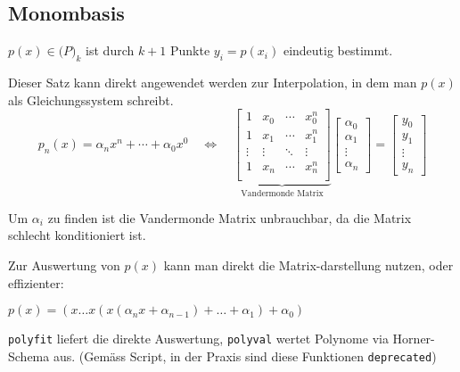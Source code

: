 \subsection{Monombasis}

 $p(x) \in \mathcal(P)_k$ ist durch $k+1$ Punkte $y_i = p(x_i)$ eindeutig bestimmt.

Dieser Satz kann direkt angewendet werden zur Interpolation, in dem man $p(x)$ als Gleichungssystem schreibt.
$$
	p_n(x) = \alpha_n x^n + \cdots + \alpha_0 x^0 \quad \iff \quad
	\underbrace{
		\begin{bmatrix}
			1      & x_0    & \cdots & x_0^n  \\
			1      & x_1    & \cdots & x_1^n  \\
			\vdots & \vdots & \ddots & \vdots \\
			1      & x_n    & \cdots & x_n^n  \\
		\end{bmatrix}
	}_\text{Vandermonde Matrix}
	\begin{bmatrix}
		\alpha_0 \\
		\alpha_1 \\
		\vdots   \\
		\alpha_n
	\end{bmatrix}
	=
	\begin{bmatrix}
		y_0    \\
		y_1    \\
		\vdots \\
		y_n
	\end{bmatrix}
$$

Um $\alpha_i$ zu finden ist die Vandermonde Matrix unbrauchbar, da die Matrix schlecht konditioniert ist.

Zur Auswertung von $p(x)$ kann man direkt die Matrix-darstellung nutzen, oder effizienter:

 $p(x) = (x \ldots x ( x (\alpha_n x + \alpha_{n-1}) + \ldots + \alpha_1) + \alpha_0)$

 \verb|polyfit| liefert die direkte Auswertung, \verb|polyval| wertet Polynome via Horner-Schema aus. (Gemäss Script, in der Praxis sind diese Funktionen \verb|deprecated|)
